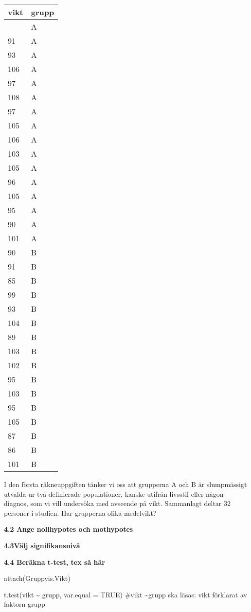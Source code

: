 \documentclass[
  letterpaper,
  DIV=11,
  numbers=noendperiod]{scrartcl}
\begin{document}
\begin{longtable}[]{@{}ll@{}}
\toprule\noalign{}
vikt & grupp \\
\midrule\noalign{}
\endhead
\bottomrule\noalign{}
\endlastfoot
90 & A \\
91 & A \\
93 & A \\
106 & A \\
97 & A \\
108 & A \\
97 & A \\
105 & A \\
106 & A \\
103 & A \\
105 & A \\
96 & A \\
105 & A \\
95 & A \\
90 & A \\
101 & A \\
90 & B \\
91 & B \\
85 & B \\
99 & B \\
93 & B \\
104 & B \\
89 & B \\
103 & B \\
102 & B \\
95 & B \\
103 & B \\
95 & B \\
105 & B \\
87 & B \\
86 & B \\
101 & B \\
\end{longtable}

I den första räkneuppgiften tänker vi oss att grupperna A och B är
slumpmässigt utvalda ur två definierade populationer, kanske utifrån
livsstil eller någon diagnos, som vi vill undersöka med avseende på
vikt. Sammanlagt deltar 32 personer i studien. Har grupperna olika
medelvikt?

\textbf{4.2 Ange nollhypotes och mothypotes}

\textbf{4.3Välj signifikansnivå}

\textbf{4.4 Beräkna t-test, tex så här}

attach(Gruppvis.Vikt)

t.test(vikt \textasciitilde{} grupp, var.equal = TRUE) \#vikt
\textasciitilde grupp ska läsas: vikt förklarat av faktorn grupp
\end{document}
